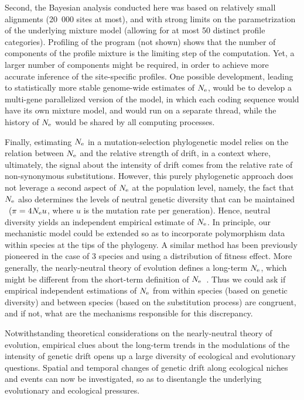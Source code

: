 \documentclass{MBE}
\begin{document}
	Second, the Bayesian analysis conducted here was based on relatively small alignments (20~000 sites at most), and with strong limits on the parametrization of the underlying mixture model (allowing for at most 50 distinct profile categories).
	Profiling of the program (not shown) shows that the number of components of the profile mixture is the limiting step of the computation.
	Yet, a larger number of components might be required, in order to achieve more accurate inference of the site-specific profiles.
	One possible development, leading to statistically more stable genome-wide estimates of $N_{\text{e}}$, would be to develop a multi-gene parallelized version of the model, in which each coding sequence would have its own mixture model, and would run on a separate thread, while the history of $N_{\text{e}}$ would be shared by all computing processes.

	Finally, estimating $N_{\text{e}}$ in a mutation-selection phylogenetic model relies on the relation between $N_{\text{e}}$ and the relative strength of drift, in a context where, ultimately, the signal about the intensity of drift comes from the relative rate of {non-synonymous} substitutions.
	However, this purely phylogenetic approach does not leverage a second aspect of $N_{\text{e}}$ at the population level, namely, the fact that $N_{\text{e}}$ also determines the levels of {neutral} genetic diversity that can be maintained ~($\pi=4N_{\text{e}} u$, where $u$ is the mutation rate per generation).
	Hence, {neutral} diversity yields an independent empirical estimate of $N_{\text{e}}$.
	In principle, our mechanistic model could be extended so as to incorporate polymorphism data within species at the tips of the phylogeny.
	A similar method has been previously pioneered in the case of 3 species and using a distribution of fitness effect\citep{Wilson2011}.
	More generally, the {nearly-neutral} theory of evolution defines a long-term $N_{\text{e}}$, which might be different from the short-term definition of $N_{\text{e}}$~\citep{Platt2018}.
	Thus we could ask if empirical independent estimations of $N_{\text{e}}$ from within species (based on genetic diversity) and between species (based on the {substitution} process) are congruent, and if not, what are the mechanisms responsible for this discrepancy.

	Notwithstanding theoretical considerations on the {nearly-neutral} theory of evolution, empirical clues about the long-term trends in the modulations of the intensity of {genetic drift} opens up a large diversity of ecological and evolutionary questions.
	Spatial and temporal changes of {genetic drift} along ecological niches and events can now be investigated, so as to disentangle the underlying evolutionary and ecological pressures.
\end{document}
